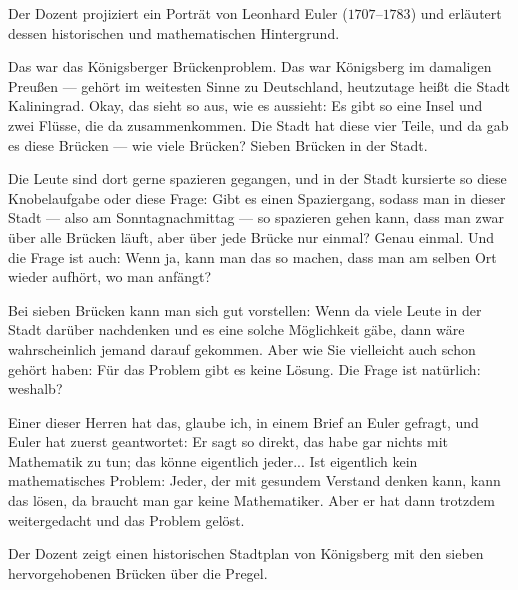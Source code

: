 \begin{meta-note}
Der Dozent projiziert ein Porträt von Leonhard Euler ($1707$--$1783$) und erläutert dessen historischen und mathematischen Hintergrund.
\end{meta-note}

\begin{spoken-clean}[00:05:40 - 00:08:07]
Das war das Königsberger Brückenproblem. Das war Königsberg im damaligen Preußen --- gehört im weitesten Sinne zu Deutschland, heutzutage heißt die Stadt Kaliningrad. Okay, das sieht so aus, wie es aussieht: Es gibt so eine Insel und zwei Flüsse, die da zusammenkommen. Die Stadt hat diese vier Teile, und da gab es diese Brücken --- wie viele Brücken? Sieben Brücken in der Stadt.

Die Leute sind dort gerne spazieren gegangen, und in der Stadt kursierte so diese Knobelaufgabe oder diese Frage: Gibt es einen Spaziergang, sodass man in dieser Stadt --- also am Sonntagnachmittag --- so spazieren gehen kann, dass man zwar über alle Brücken läuft, aber über jede Brücke nur einmal? Genau einmal. Und die Frage ist auch: Wenn ja, kann man das so machen, dass man am selben Ort wieder aufhört, wo man anfängt?

Bei sieben Brücken kann man sich gut vorstellen: Wenn da viele Leute in der Stadt darüber nachdenken und es eine solche Möglichkeit gäbe, dann wäre wahrscheinlich jemand darauf gekommen. Aber wie Sie vielleicht auch schon gehört haben: Für das Problem gibt es keine Lösung. Die Frage ist natürlich: weshalb?

Einer dieser Herren hat das, glaube ich, in einem Brief an Euler gefragt, und Euler hat zuerst geantwortet:  Er sagt so direkt, das habe gar nichts mit Mathematik zu tun; das könne eigentlich jeder... Ist eigentlich kein mathematisches Problem: Jeder, der mit gesundem Verstand denken kann, kann das lösen, da braucht man gar keine Mathematiker. Aber er hat dann trotzdem weitergedacht und das Problem gelöst.
\end{spoken-clean}

\begin{meta-note}
Der Dozent zeigt einen historischen Stadtplan von Königsberg mit den sieben hervorgehobenen Brücken über die Pregel.
\end{meta-note}

